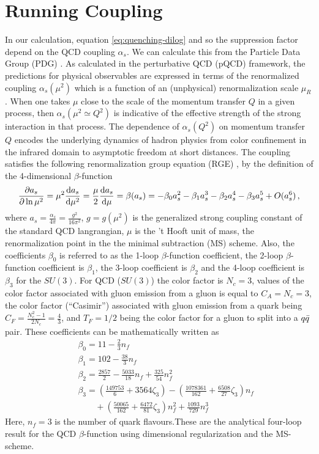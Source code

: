 \documentclass[11pt,onecolumn]{article}
\newcommand{\dd}{{\rm d}}
\newcommand{\beq}{\begin{equation}}
\newcommand{\eeq}{\end{equation}}
\newcommand{\bqa}{\begin{eqnarray}}
\newcommand{\eqa}{\end{eqnarray}}
\begin{document}
\section{Running Coupling}
In our calculation, equation \ref{eq:quenching-dilog} and so the suppression factor depend on the QCD coupling $\alpha_s$.  We can calculate this from the Particle Data Group (PDG) \cite{pdg:2022pth, Deur:2016tte}. As calculated in the perturbative QCD (pQCD) framework, the predictions for physical observables are expressed in terms of the renormalized coupling $\alpha_s(\mu^2)$ which is a function of an (unphysical) renormalization scale $\mu_R$. When one takes $\mu$ close to the scale of the momentum transfer $Q$ in a given process, then $\alpha_s(\mu^2 \simeq Q^2)$ is indicative of the effective strength of the strong interaction in that process. The dependence of $\alpha_s(Q^2)$ on momentum transfer $Q$ encodes the underlying dynamics of hadron physics from color confinement in the infrared domain to asymptotic freedom at short distances. The coupling satisfies the following renormalization group equation (RGE) \cite{pdg:2022pth}, by the definition of the 4-dimensional $\beta$-function \cite{vanRitbergen:1997va}
\beq
\frac{\partial a_s}{\partial \ln \mu^2} = \mu^2 \frac{\dd a_s}{\dd \mu^2} = \frac{\mu}{2} \frac{\dd a_s}{\dd \mu} = \beta(a_s) = - \beta_0 a_s^2 - \beta_1 a_s^3 - \beta_2 a_s^4 - \beta_3 a_s^5 + O(a_s^6)  \, ,
\eeq
where $a_s = \frac{\alpha_s}{4 \pi} = \frac{g^2}{16 \pi^2}$, $g = g(\mu^2)$ is the generalized strong coupling constant of the standard QCD langrangian, $\mu$ is the 't Hooft unit of mass, the renormalization point in the the minimal subtraction (MS) scheme. Also, the coefficients $\beta_0$ is referred to as the 1-loop $\beta$-function coefficient, the 2-loop $\beta$-function coefficient is  $\beta_1$, the 3-loop coefficient is $\beta_2$ and the 4-loop coefficient is $\beta_3$ for the $SU(3)$. For QCD ($SU(3)$) the color factor is $N_c = 3$, values of the color factor associated with gluon emission from a gluon is equal to $C_A = N_c = 3$, the color factor (“Casimir”) associated with gluon emission from a quark being $C_F = \frac{N_c^2-1}{2N_c} = \frac{4}{3}$, and $T_F = 1/2$ being the color factor for a gluon to split into a $q\Bar{q}$ pair. These coefficients can be mathematically written as \cite{vanRitbergen:1997va}
\bqa
&& \beta_0 = 11 - \frac{2}{3} n_f \\
&& \beta_1 = 102 - \frac{38}{3} n_f  \\
&& \beta_2 = \frac{2857}{2} - \frac{5033}{18} n_f + 
\frac{325}{54} n_f^2 \\ 
&& \beta_3 = \left( \frac{149753}{6} + 3564\zeta_3 \right) - \left( \frac{1078361}{162} + \frac{6508}{27} \zeta_3 \right) n_f \nonumber \\ 
&& \qquad + \left( \frac{50065}{162} +  \frac{6472}{81}\zeta_3  \right) n_f^2 + \frac{1093}{729}n_f^3
\eqa
Here, $n_f = 3$ is the number of quark flavours.These are the analytical four-loop result for the QCD $\beta$-function using dimensional regularization and the MS-scheme.
\end{document}

